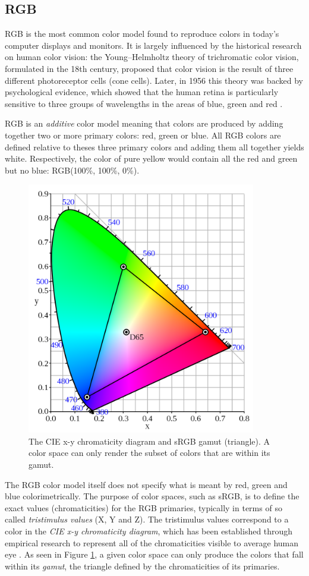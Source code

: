 \documentclass[thesis.tex]{subfiles}
\begin{document}
\subsection{RGB}
RGB is the most common color model found to reproduce colors in today's computer displays and monitors. It is largely influenced by the historical research on human color vision: the Young–Helmholtz theory of trichromatic color vision, formulated in the 18th century, proposed that color vision is the result of three different photoreceptor cells (cone cells). Later, in 1956 this theory was backed by psychological evidence, which showed that the human retina is particularly sensitive to three groups of wavelengths in the areas of blue, green and red \cite{svaetichin}.

RGB is an \textit{additive} color model meaning that colors are produced by adding together two or more primary colors: red, green or blue. All RGB colors are defined relative to theses three primary colors and adding them all together yields white. Respectively, the color of pure yellow would contain all the red and green but no blue: RGB(100\%, 100\%, 0\%).

\begin{figure}[hb]
\centering \includegraphics[width=10cm]{images/srgb}
\caption{The CIE x-y chromaticity diagram and sRGB gamut (triangle). A color space can only render the subset of colors that are within its gamut.\label{figure:srgb}}
\end{figure}

The RGB color model itself does not specify what is meant by red, green and blue colorimetrically. The purpose of color spaces, such as sRGB, is to define the exact values (chromaticities) for the RGB primaries, typically in terms of so called \textit{tristimulus values} (X, Y and Z). The tristimulus values correspond to a color in the \textit{CIE x-y chromaticity diagram}, which has been established through empirical research to represent all of the chromaticities visible to average human eye \cite{cie}. As seen in Figure \ref{figure:srgb}, a given color space can only produce the colors that fall within its \textit{gamut}, the triangle defined by the chromaticities of its primaries.
\end{document}
